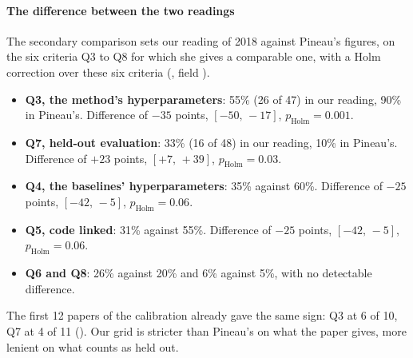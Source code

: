 \paragraph{The difference between the two readings}
The secondary comparison sets our reading of 2018 against Pineau's figures, on the six
criteria Q3 to Q8 for which she gives a comparable one, with a Holm correction over these six criteria
(, field ).
\begin{itemize}
  \item \textbf{Q3, the method's hyperparameters}: 55\% (26 of 47) in our reading, 90\% in Pineau's.
  Difference of $-35$ points, $[-50,\,-17]$, $p_{\text{Holm}} = 0.001$.
  \item \textbf{Q7, held-out evaluation}: 33\% (16 of 48) in our reading, 10\% in Pineau's. Difference of
  $+23$ points, $[+7,\,+39]$, $p_{\text{Holm}} = 0.03$.
  \item \textbf{Q4, the baselines' hyperparameters}: 35\% against 60\%. Difference of $-25$ points,
  $[-42,\,-5]$, $p_{\text{Holm}} = 0.06$.
  \item \textbf{Q5, code linked}: 31\% against 55\%. Difference of $-25$ points, $[-42,\,-5]$,
  $p_{\text{Holm}} = 0.06$.
  \item \textbf{Q6 and Q8}: 26\% against 20\% and 6\% against 5\%, with no detectable difference.
\end{itemize}


The first 12 papers of the calibration already gave the same sign: Q3 at 6 of 10, Q7 at 4 of 11
(). Our grid is stricter than Pineau's on what the paper gives, more lenient
on what counts as held out.


